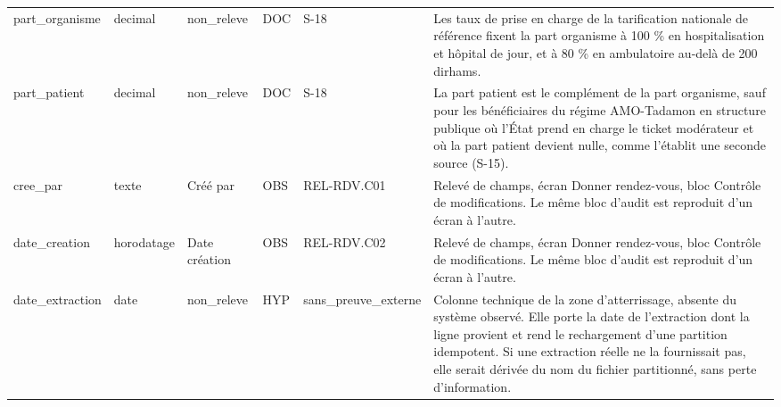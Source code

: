 \begin{longtable}{p{2.5cm}p{1.8cm}p{2.8cm}p{1.3cm}p{2.2cm}p{5cm}}
part\_organisme & decimal & non\_releve & DOC & S-18 & Les taux de prise en charge de la tarification nationale de référence fixent la part organisme à 100 \% en hospitalisation et hôpital de jour, et à 80 \% en ambulatoire au-delà de 200 dirhams. \\
part\_patient & decimal & non\_releve & DOC & S-18 & La part patient est le complément de la part organisme, sauf pour les bénéficiaires du régime AMO-Tadamon en structure publique où l'État prend en charge le ticket modérateur et où la part patient devient nulle, comme l'établit une seconde source (S-15). \\
cree\_par & texte & Créé par & OBS & REL-RDV.C01 & Relevé de champs, écran Donner rendez-vous, bloc Contrôle de modifications. Le même bloc d'audit est reproduit d'un écran à l'autre. \\
date\_creation & horodatage & Date création & OBS & REL-RDV.C02 & Relevé de champs, écran Donner rendez-vous, bloc Contrôle de modifications. Le même bloc d'audit est reproduit d'un écran à l'autre. \\
date\_extraction & date & non\_releve & HYP & sans\_preuve\_externe & Colonne technique de la zone d'atterrissage, absente du système observé. Elle porte la date de l'extraction dont la ligne provient et rend le rechargement d'une partition idempotent. Si une extraction réelle ne la fournissait pas, elle serait dérivée du nom du fichier partitionné, sans perte d'information. \\
\hline
\end{longtable}

